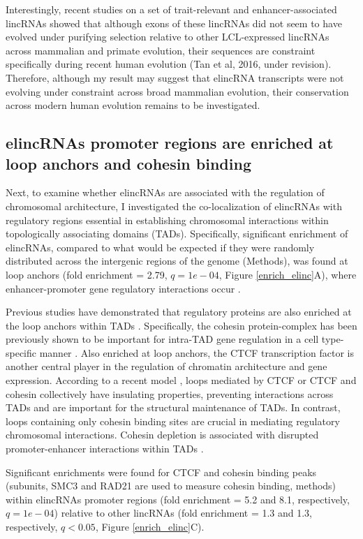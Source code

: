 \documentclass[11pt,a4paper]{report}
\begin{document}
Interestingly, recent studies on a set of trait-relevant and enhancer-associated lincRNAs showed that although exons of these lincRNAs did not seem to have evolved under purifying selection relative to other LCL-expressed lincRNAs across mammalian and primate evolution, their sequences are constraint specifically during recent human evolution (Tan et al, 2016, under revision). Therefore, although my result may suggest that elincRNA transcripts were not evolving under constraint across broad mammalian evolution, their conservation across modern human evolution remains to be investigated.

\subsection*{elincRNAs promoter regions are enriched at loop anchors and cohesin binding}

Next, to examine whether elincRNAs are associated with the regulation of chromosomal architecture, I investigated the co-localization of elincRNAs with regulatory regions essential in establishing chromosomal interactions within topologically associating domains (TADs). Specifically, significant enrichment ⁠of elincRNAs, compared to what would be expected if they were randomly distributed across the intergenic regions of the genome (Methods), was found at loop anchors (fold enrichment = 2.79, $q=1e-04$, Figure \ref{enrich_elinc}A), where enhancer-promoter gene regulatory interactions occur \cite{Ji2016}.  

Previous studies have demonstrated that regulatory proteins are also enriched at the loop anchors within TADs \cite{Rao2014}⁠. Specifically, the cohesin protein-complex has been previously shown to be important for intra-TAD gene regulation in a cell type-specific manner \cite{Hadjur2009}⁠. Also enriched at loop anchors, the CTCF transcription factor is another central player in the regulation of chromatin architecture and gene expression. According to a recent model \cite{Ji2016}⁠, loops mediated by CTCF or CTCF and cohesin collectively have insulating properties, preventing interactions across TADs and are important for the structural maintenance of TADs. In contrast, loops containing only cohesin binding sites are crucial in mediating regulatory chromosomal interactions. Cohesin depletion is associated with disrupted promoter-enhancer interactions within TADs \cite{Seitan2013}⁠.

Significant enrichments were found for CTCF and cohesin binding peaks (subunits, SMC3 and RAD21 are used to measure cohesin binding, methods) within elincRNAs promoter regions (fold enrichment = 5.2 and 8.1, respectively, $q=1e-04$) relative to other lincRNAs (fold enrichment = 1.3 and 1.3, respectively, $q<0.05$, Figure \ref{enrich_elinc}C).
\end{document}
